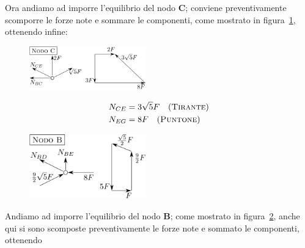 Ora andiamo ad imporre l'equilibrio del nodo $\mathbf{C}$; conviene preventivamente scomporre le forze note e sommare le componenti, come mostrato in figura~\ref{Esercizio9-1-6}, ottenendo infine:
\renewcommand{\thefigure}{9.1~-~6}
\begin{figure}[ht]
\centering
\includegraphics[width=0.45\textwidth]{Immagini/Parte_9/Esercizio9_1/Esercizio9_1_6.pdf}
\caption{}
\label{Esercizio9-1-6}
\end{figure}
\begin{align*}
N_{CE} &= 3\sqrt{5}F \quad (\textup{\textsc{Tirante}}) \\
N_{EG} &= 8F \quad (\textup{\textsc{Puntone}}) 
\end{align*}
\renewcommand{\thefigure}{9.1~-~7}
\begin{figure}[ht]
\centering
\includegraphics[width=0.45\textwidth]{Immagini/Parte_9/Esercizio9_1/Esercizio9_1_7.pdf}
\caption{}
\label{Esercizio9-1-7}
\end{figure}
Andiamo ad imporre l'equilibrio del nodo $\mathbf{B}$; come mostrato in figura~\ref{Esercizio9-1-7}, anche qui si sono scomposte preventivamente le forze note e sommato le componenti, ottenendo
